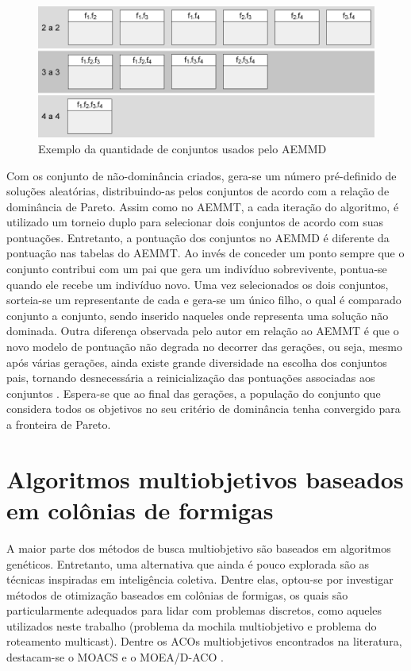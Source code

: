 \begin{figure}[!htbp]
	\label{fig_aemmd_tabelas}
	\centering
	\includegraphics[width=1\textwidth]{cap_otimizacao-multi/figs/aeemd-tabelas}
	\caption{Exemplo da quantidade de conjuntos usados pelo AEMMD}
\end{figure}

Com os conjunto de não-dominância criados, gera-se um número pré-definido de soluções aleatórias, distribuindo-as pelos conjuntos de acordo com a relação de dominância de Pareto. Assim como no AEMMT, a cada iteração do algoritmo, é utilizado um torneio duplo para selecionar dois conjuntos de acordo com suas pontuações. Entretanto, a pontuação dos conjuntos no AEMMD é diferente da pontuação nas tabelas do AEMMT. Ao invés de conceder um ponto sempre que o conjunto contribui com um pai que gera um indivíduo sobrevivente, pontua-se quando ele recebe um indivíduo novo. Uma vez selecionados os dois conjuntos, sorteia-se um representante de cada e gera-se um único filho, o qual é comparado conjunto a conjunto, sendo inserido naqueles onde representa uma solução não dominada. Outra diferença observada pelo autor em relação ao AEMMT é que o novo modelo de pontuação não degrada no decorrer das gerações, ou seja, mesmo após várias gerações, ainda existe grande diversidade na escolha dos conjuntos pais, tornando desnecessária a reinicialização das pontuações associadas aos conjuntos \cite{Lafeta2016}. Espera-se que ao final das gerações, a população do conjunto que considera todos os objetivos no seu critério de dominância tenha convergido para a fronteira de Pareto. 

\section{Algoritmos multiobjetivos baseados em colônias de formigas}

A maior parte dos métodos de busca multiobjetivo são baseados em algoritmos genéticos. Entretanto, uma alternativa que ainda é pouco explorada são as técnicas inspiradas em inteligência coletiva. Dentre elas, optou-se por investigar métodos de otimização baseados em colônias de formigas, os quais são particularmente adequados para lidar com problemas discretos, como aqueles utilizados neste trabalho (problema da mochila multiobjetivo e problema do roteamento multicast). Dentre os ACOs multiobjetivos encontrados na literatura, destacam-se o MOACS \cite{Baran2003} e o MOEA/D-ACO \cite{Ke2013}.

